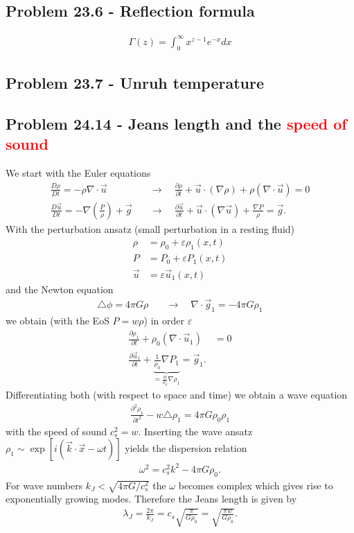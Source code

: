 \documentclass[../main.tex]{subfiles}
\begin{document}
\subsection{Problem 23.6 - Reflection formula}
\begin{align}
    \Gamma(z)=\int_0^\infty x^{z-1}e^{-x}dx
\end{align}



\subsection{Problem 23.7 - Unruh temperature}

\subsection{Problem 24.14 - Jeans length and the \textcolor{red}{speed of sound}}
We start with the Euler equations
\begin{align}
    \frac{D\rho}{Dt}=-\rho\nabla\cdot\vec{u}\quad&\rightarrow\quad\frac{\partial\rho}{\partial t}+\vec{u}\cdot(\nabla\rho)+\rho(\nabla\cdot\vec{u})=0\\
    \frac{D\vec{u}}{Dt}=-\nabla\left(\frac{P}{\rho}\right)+\vec{g}\quad&\rightarrow\quad\frac{\partial\vec{u}}{\partial t}+\vec{u}\cdot(\nabla\vec{u})+\frac{\nabla P}{\rho}=\vec{g}.
\end{align}
With the perturbation ansatz (small perturbation in a resting fluid)
\begin{align}
    \rho&=\rho_0+\varepsilon \rho_1(x,t)\\
    P&=P_0+\varepsilon P_1(x,t)\\
    \vec{u}&=\varepsilon \vec{u}_1(x,t)
\end{align}
and the Newton equation
\begin{align}
    \triangle\phi=4\pi G\rho\quad&\rightarrow\quad\nabla\cdot\vec{g}_1=-4\pi G\rho_1
\end{align}
we obtain (with the EoS $P=w\rho$) in order $\varepsilon$
\begin{align}
    \frac{\partial\rho_1}{\partial t}+\rho_0(\nabla\cdot\vec{u}_1)&=0\\
    \frac{\partial\vec{u}_1}{\partial t}+\underbrace{\frac{1}{\rho_0}\nabla P_1}_{=\frac{w}{\rho_0}\nabla\rho_1}=\vec{g}_1.
\end{align}
Differentiating both (with respect to space and time) we obtain a wave equation
\begin{align}
    \frac{\partial^2\rho_1}{\partial t^2}-w\triangle\rho_1=4\pi G\rho_0\rho_1
\end{align}
with the speed of sound $c_s^2=w$. Inserting the wave ansatz $\rho_1\sim\exp[i(\vec{k}\cdot\vec{x}-\omega t)]$ yields the dispersion relation
\begin{align}
    \omega^2=c_s^2k^2-4\pi G\rho_0.
\end{align}
For wave numbers $k_J<\sqrt{4\pi G/c_s^2}$ the $\omega$ becomes complex which gives rise to exponentially growing modes. Therefore the Jeans length is given by
\begin{align}
    \lambda_J=\frac{2\pi}{k_J}=c_s\sqrt{\frac{\pi}{G\rho_0}}=\sqrt{\frac{\pi w}{G\rho_0}}.
\end{align}
\end{document}
